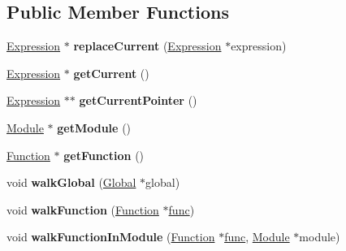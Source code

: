 \subsection*{Public Member Functions}
\begin{DoxyCompactItemize}
\item 
\mbox{\label{structwasm_1_1_walker_a943b52f1cc2bc554d0b19d94aaf16310}} 
\mbox{\hyperlink{classwasm_1_1_expression}{Expression}} $\ast$ {\bfseries replace\+Current} (\mbox{\hyperlink{classwasm_1_1_expression}{Expression}} $\ast$expression)
\item 
\mbox{\label{structwasm_1_1_walker_a9bc524c7dc324e0bbdf881519774e7da}} 
\mbox{\hyperlink{classwasm_1_1_expression}{Expression}} $\ast$ {\bfseries get\+Current} ()
\item 
\mbox{\label{structwasm_1_1_walker_a18ffc1e2a9516df0679985bcb05a4e36}} 
\mbox{\hyperlink{classwasm_1_1_expression}{Expression}} $\ast$$\ast$ {\bfseries get\+Current\+Pointer} ()
\item 
\mbox{\label{structwasm_1_1_walker_a99e109997a47e56ae50e6b4da95263b3}} 
\mbox{\hyperlink{classwasm_1_1_module}{Module}} $\ast$ {\bfseries get\+Module} ()
\item 
\mbox{\label{structwasm_1_1_walker_a7278ff6b658884f94624dcdb9c9d6a17}} 
\mbox{\hyperlink{classwasm_1_1_function}{Function}} $\ast$ {\bfseries get\+Function} ()
\item 
\mbox{\label{structwasm_1_1_walker_a236a2a64b72d7e94c68405f958adb0c6}} 
void {\bfseries walk\+Global} (\mbox{\hyperlink{classwasm_1_1_global}{Global}} $\ast$global)
\item 
\mbox{\label{structwasm_1_1_walker_a92cd1632ee695bd2fa4e30c70e077c88}} 
void {\bfseries walk\+Function} (\mbox{\hyperlink{classwasm_1_1_function}{Function}} $\ast$\mbox{\hyperlink{structfunc}{func}})
\item 
\mbox{\label{structwasm_1_1_walker_ace1cebdda8e52c12a9884427fd3a76fa}} 
void {\bfseries walk\+Function\+In\+Module} (\mbox{\hyperlink{classwasm_1_1_function}{Function}} $\ast$\mbox{\hyperlink{structfunc}{func}}, \mbox{\hyperlink{classwasm_1_1_module}{Module}} $\ast$module)
$$
\end{DoxyCompactItemize}
